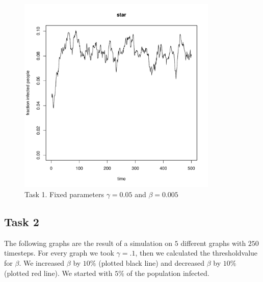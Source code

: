 \documentclass[paper=a4, fontsize=11pt]{scrartcl} %
\begin{document}
\begin{figure}[h] %
   \centering
   \includegraphics[width=0.85\textwidth]{task1_star} 
\caption{Task 1. Fixed parameters $\gamma=0.05$ and $\beta=0.005$}
   \label{task1_star}
\end{figure}


\subsection{Task 2}
The following graphs are the result of a simulation on $5$ different graphs with $250$ timesteps. For every graph we took $\gamma=.1$, then we calculated the thresholdvalue for $\beta$. We increased $\beta$ by $10\%$ (plotted black line) and decreased $\beta$ by $10\%$ (plotted red line). We started with $5\%$ of the population infected.
\end{document}
